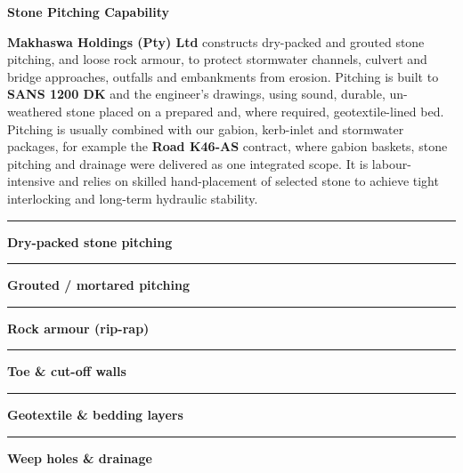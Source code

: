 \documentclass[a4paper,11pt]{article}
\providecommand{\faMountain}{\faLayerGroup}
\begin{document}
\noindent
\begin{minipage}[t]{0.62\textwidth}
    \vspace{0pt}
    {\large\bfseries\color{mhnavy} Stone Pitching Capability}
    \vspace{0.08cm}

    {\fontsize{8.5pt}{11.8pt}\selectfont\color{mhtext}
    \textbf{Makhaswa Holdings (Pty) Ltd} constructs dry-packed and grouted stone pitching, and loose rock armour, to protect stormwater channels, culvert and bridge approaches, outfalls and embankments from erosion. Pitching is built to \textbf{SANS 1200 DK} and the engineer's drawings, using sound, durable, un-weathered stone placed on a prepared and, where required, geotextile-lined bed.\\[3pt]
    Pitching is usually combined with our gabion, kerb-inlet and stormwater packages, for example the \textbf{Road K46-AS} contract, where gabion baskets, stone pitching and drainage were delivered as one integrated scope. It is labour-intensive and relies on skilled hand-placement of selected stone to achieve tight interlocking and long-term hydraulic stability.
    }
\end{minipage}
\hfill
\begin{minipage}[t]{0.34\textwidth}
    \vspace{0pt}
    \begin{tcolorbox}[
        enhanced, colback=mhoffwhite, colframe=mhnavy, boxrule=0.8pt, arc=4pt,
        title={\bfseries\color{white}\faMountain\ Pitching Scope of Work},
        colbacktitle=mhnavy, left=7pt, right=7pt, top=5pt, bottom=5pt,
        drop shadow=black!4
    ]
        \fontsize{7.8pt}{11.0pt}\selectfont
        \textcolor{mhnavy}{\rule{3.5pt}{3.5pt}}\hspace{4pt}\textbf{Dry-packed stone pitching}\\
        \textcolor{mhnavy}{\rule{3.5pt}{3.5pt}}\hspace{4pt}\textbf{Grouted / mortared pitching}\\
        \textcolor{mhnavy}{\rule{3.5pt}{3.5pt}}\hspace{4pt}\textbf{Rock armour (rip-rap)}\\
        \textcolor{mhnavy}{\rule{3.5pt}{3.5pt}}\hspace{4pt}\textbf{Toe \& cut-off walls}\\
        \textcolor{mhnavy}{\rule{3.5pt}{3.5pt}}\hspace{4pt}\textbf{Geotextile \& bedding layers}\\
        \textcolor{mhnavy}{\rule{3.5pt}{3.5pt}}\hspace{4pt}\textbf{Weep holes \& drainage}
    \end{tcolorbox}
\end{minipage}
\end{document}
